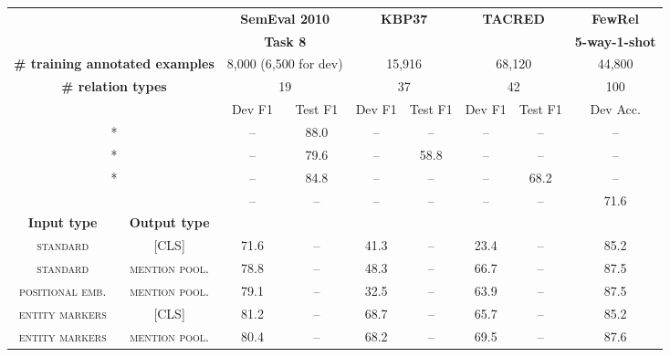 \begin{table*}[p]
    \setlength{\tabcolsep}{5pt}
    \centering
    \footnotesize
    \begin{tabular}{|c|c|cc|cc|cc|c|}
    \hline
    \multicolumn{2}{|c|}{}
        & \multicolumn{2}{c|}{\textbf{SemEval 2010}}
        & \multicolumn{2}{c|}{\textbf{KBP37}}
        & \multicolumn{2}{c|}{\textbf{TACRED}} 
        & \textbf{FewRel} \\
    \multicolumn{2}{|c|}{}
        & \multicolumn{2}{c|}{\textbf{Task 8}}
        & \multicolumn{2}{c|}{}
        & \multicolumn{2}{c|}{}
        & \textbf{5-way-1-shot} \\        \hline
\multicolumn{2}{|c|}{\textbf{\# training annotated examples}} &
 \multicolumn{2}{c|}{8,000 (6,500 for dev)}    & 
 \multicolumn{2}{c|}{15,916}  & 
 \multicolumn{2}{c|}{68,120}  &
 44,800\\ \hline
\multicolumn{2}{|c|}{\textbf{\# relation types}} &
 \multicolumn{2}{c|}{19}  & 
 \multicolumn{2}{c|}{37}  & 
 \multicolumn{2}{c|}{42}  &
 100 \\ \hline
\multicolumn{2}{|c|}{} & Dev F1 & Test F1 & Dev F1 & Test F1 & Dev F1 & Test F1 & Dev Acc. \\ \hline
\multicolumn{2}{|c|}{\citet{P16-1123}*}  & -- & 88.0 & -- & -- & -- & -- & -- \\ \hline 
\multicolumn{2}{|c|}{\citet{ZhangW15a}*} & -- & 79.6 & -- & 58.8 & -- & -- & -- \\ \hline
\multicolumn{2}{|c|}{\citet{DBLP:journals/corr/abs-1807-03052}*} & -- & 84.8 & -- & -- & -- & 68.2 & -- \\ \hline
\multicolumn{2}{|c|}{\citet{han2018fewrel}}       & --    & -- & -- & -- & -- & -- & 71.6 \\ \hline \hline
\textbf{Input type}  & \textbf{Output type}       &        &    &       &     &       &   & \\ \hline
\textsc{standard} & \textsc{[CLS]}                & 71.6  & -- & 41.3  & --  & 23.4  & --  & 85.2 \\ \hline
\textsc{standard} & \textsc{mention pool.}        & 78.8  & -- & 48.3  & --  & 66.7  & --  & 87.5 \\ \hline
\textsc{positional emb.} & \textsc{mention pool.} & 79.1  & -- & 32.5  & --  & 63.9  & --  & 87.5 \\ \hline
\textsc{entity markers} & \textsc{[CLS]}          & 81.2  & --	& 68.7  & --  & 65.7  & --  & 85.2 \\ \hline
\textsc{entity markers} & \textsc{mention pool.}  & 80.4  & -- & 68.2  & --  & 69.5  & --  & 87.6 \\ \hline

\end{tabular}
\end{table*}
